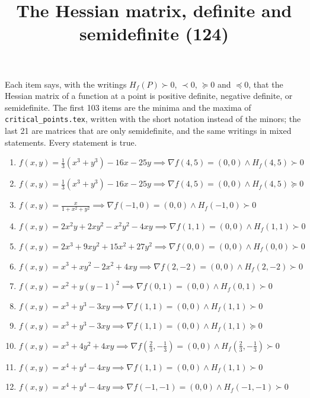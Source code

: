 \documentclass[11pt,a4paper]{article}
\title{The Hessian matrix, definite and semidefinite (124)}
\author{}
\date{}
\begin{document}
\maketitle
Each item says, with the writings $H_{f}(P) \succ 0$, $\prec 0$, $\succeq 0$ and $\preceq 0$, that the Hessian matrix of a function at a point is positive definite, negative definite, or semidefinite. The first 103 items are the minima and the maxima of \texttt{critical\_points.tex}, written with the short notation instead of the minors; the last 21 are matrices that are only semidefinite, and the same writings in mixed statements. Every statement is true.

\begin{enumerate}
\item $\displaystyle f(x, y) = \frac{1}{3}(x^{3} + y^{3}) - 16x - 25y \implies \nabla f(4, 5) = (0, 0) \land H_{f}(4, 5) \succ 0$
\item $\displaystyle f(x, y) = \frac{1}{3}(x^{3} + y^{3}) - 16x - 25y \implies \nabla f(4, 5) = (0, 0) \land H_{f}(4, 5) \succeq 0$
\item $\displaystyle f(x, y) = \frac{x}{1 + x^{2} + y^{2}} \implies \nabla f(-1, 0) = (0, 0) \land H_{f}(-1, 0) \succ 0$
\item $\displaystyle f(x, y) = 2x^{2} y + 2x y^{2} - x^{2} y^{2} - 4xy \implies \nabla f(1, 1) = (0, 0) \land H_{f}(1, 1) \succ 0$
\item $\displaystyle f(x, y) = 2x^{3} + 9x y^{2} + 15x^{2} + 27y^{2} \implies \nabla f(0, 0) = (0, 0) \land H_{f}(0, 0) \succ 0$
\item $\displaystyle f(x, y) = x^{3} + x y^{2} - 2x^{2} + 4xy \implies \nabla f(2, -2) = (0, 0) \land H_{f}(2, -2) \succ 0$
\item $\displaystyle f(x, y) = x^{2} + y(y - 1)^{2} \implies \nabla f(0, 1) = (0, 0) \land H_{f}(0, 1) \succ 0$
\item $\displaystyle f(x, y) = x^{3} + y^{3} - 3xy \implies \nabla f(1, 1) = (0, 0) \land H_{f}(1, 1) \succ 0$
\item $\displaystyle f(x, y) = x^{3} + y^{3} - 3xy \implies \nabla f(1, 1) = (0, 0) \land H_{f}(1, 1) \succeq 0$
\item $\displaystyle f(x, y) = x^{3} + 4y^{2} + 4xy \implies \nabla f\left( \frac{2}{3}, -\frac{1}{3} \right) = (0, 0) \land H_{f}\left( \frac{2}{3}, -\frac{1}{3} \right) \succ 0$
\item $\displaystyle f(x, y) = x^{4} + y^{4} - 4xy \implies \nabla f(1, 1) = (0, 0) \land H_{f}(1, 1) \succ 0$
\item $\displaystyle f(x, y) = x^{4} + y^{4} - 4xy \implies \nabla f(-1, -1) = (0, 0) \land H_{f}(-1, -1) \succ 0$

\end{enumerate}
\end{document}
